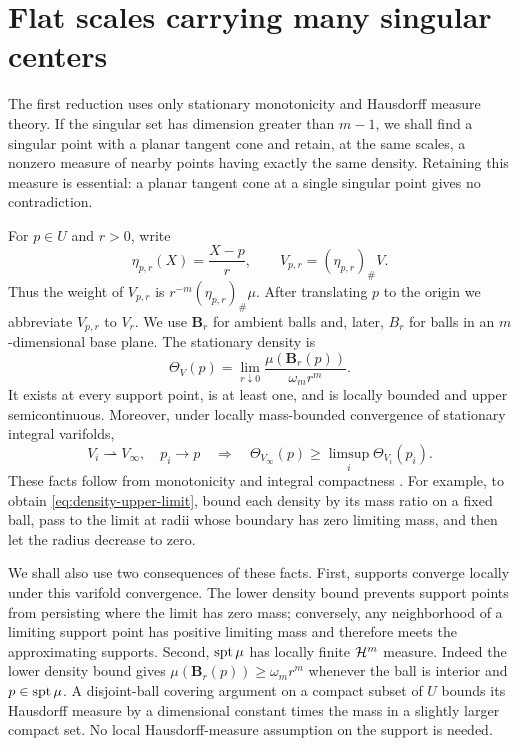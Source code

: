 \section{Flat scales carrying many singular centers}
\label{sec:flat-scales}

The first reduction uses only stationary monotonicity and Hausdorff
measure theory. If the singular set has dimension greater than $m-1$,
we shall find a singular point with a planar tangent cone and retain,
at the same scales, a nonzero measure of nearby points having exactly
the same density. Retaining this measure is essential: a planar
tangent cone at a single singular point gives no contradiction.

For $p\in U$ and $r>0$, write
\[
 \eta_{p,r}(X)=\frac{X-p}{r},\qquad
 V_{p,r}=(\eta_{p,r})_\#V.
\]
Thus the weight of $V_{p,r}$ is $r^{-m}(\eta_{p,r})_\#\mu$.
After translating $p$ to the origin we abbreviate $V_{p,r}$ to $V_r$.
We use $\mathbf B_r$ for ambient balls and, later, $B_r$ for balls in
an $m$-dimensional base plane. The stationary density is
\[
 \Theta_V(p)=\lim_{r\downarrow0}
       \frac{\mu(\mathbf B_r(p))}{\omega_m r^m}.
\]
It exists at every support point, is at least one, and is locally
bounded and upper semicontinuous. Moreover, under locally mass-bounded
convergence of stationary integral varifolds,
\begin{equation}
 \label{eq:density-upper-limit}
 V_i\rightharpoonup V_\infty,\quad p_i\longrightarrow p
 \quad\Longrightarrow\quad
 \Theta_{V_\infty}(p)\ge\limsup_i\Theta_{V_i}(p_i).
\end{equation}
These facts follow from monotonicity and integral compactness
\cite{Allard1972,Simon1983}. For example, to obtain
\eqref{eq:density-upper-limit}, bound each density by its mass ratio
on a fixed ball, pass to the limit at radii whose boundary has zero
limiting mass, and then let the radius decrease to zero.

We shall also use two consequences of these facts. First, supports
converge locally under this varifold convergence. The lower density
bound prevents support points from persisting where the limit has
zero mass; conversely, any neighborhood of a limiting support point
has positive limiting mass and therefore meets the approximating
supports. Second, $\operatorname{spt}\mu$ has locally finite $\mathcal H^m$ measure.
Indeed the lower density bound gives
$\mu(\mathbf B_r(p))\ge\omega_m r^m$ whenever the ball is interior
and $p\in\operatorname{spt}\mu$. A disjoint-ball covering argument on a compact
subset of $U$ bounds its Hausdorff measure by a dimensional constant
times the mass in a slightly larger compact set. No local
Hausdorff-measure assumption on the support is needed.

